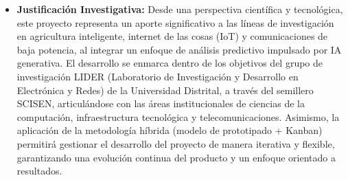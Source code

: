 \begin{itemize}
      \item \textbf{Justificación Investigativa:} Desde una perspectiva científica
            y tecnológica, este proyecto representa un aporte significativo a  las
            líneas de investigación en agricultura inteligente,  internet  de  las
            cosas (IoT) y comunicaciones de baja potencia, al integrar un  enfoque
            de análisis predictivo impulsado por IA generativa. El  desarrollo  se
            enmarca dentro de los  objetivos  del  grupo  de  investigación  LIDER
            (Laboratorio de Investigación y Desarrollo en Electrónica y Redes)  de
            la Universidad Distrital, a través del semillero SCISEN, articulándose
            con  las  áreas  institucionales  de  ciencias  de   la   computación,
            infraestructura  tecnológica  y   telecomunicaciones.   Asimismo,   la
            aplicación  de  la  metodología  híbrida (modelo de prototipado + Kanban)   permitirá   gestionar   el
            desarrollo del proyecto de manera iterativa y  flexible,  garantizando
            una  evolución  continua  del  producto  y  un  enfoque  orientado   a
            resultados.


\end{itemize}
